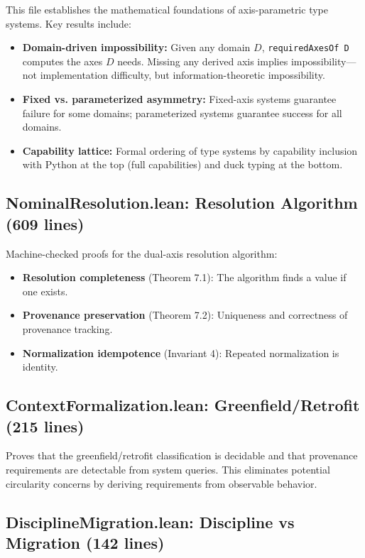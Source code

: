 This file establishes the mathematical foundations of axis-parametric type systems. Key results include:

\begin{itemize}
\item \textbf{Domain-driven impossibility:} Given any domain $D$, \texttt{requiredAxesOf D} computes the axes $D$ needs. Missing any derived axis implies impossibility---not implementation difficulty, but information-theoretic impossibility.
\item \textbf{Fixed vs. parameterized asymmetry:} Fixed-axis systems guarantee failure for some domains; parameterized systems guarantee success for all domains.
\item \textbf{Capability lattice:} Formal ordering of type systems by capability inclusion with Python at the top (full capabilities) and duck typing at the bottom.
\end{itemize}

\subsection{NominalResolution.lean: Resolution Algorithm (609 lines)}\label{sec:lean-nominal}

Machine-checked proofs for the dual-axis resolution algorithm:

\begin{itemize}
\item \textbf{Resolution completeness} (Theorem 7.1): The algorithm finds a value if one exists.
\item \textbf{Provenance preservation} (Theorem 7.2): Uniqueness and correctness of provenance tracking.
\item \textbf{Normalization idempotence} (Invariant 4): Repeated normalization is identity.
\end{itemize}

\subsection{ContextFormalization.lean: Greenfield/Retrofit (215 lines)}\label{sec:lean-context}

Proves that the greenfield/retrofit classification is decidable and that provenance requirements are detectable from system queries. This eliminates potential circularity concerns by deriving requirements from observable behavior.

\subsection{DisciplineMigration.lean: Discipline vs Migration (142 lines)}\label{sec:lean-discipline}

